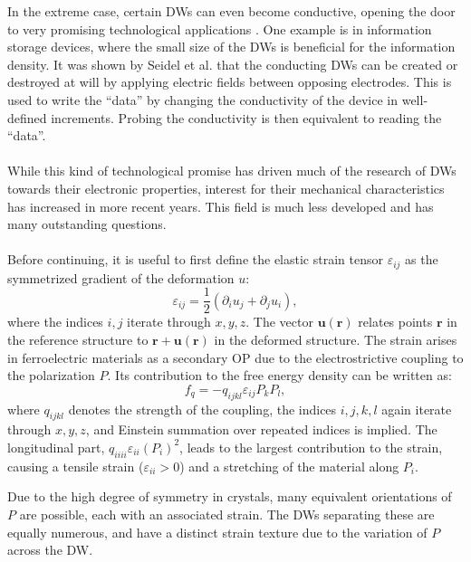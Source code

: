 In the extreme case, certain DWs can even become conductive, opening the door to very promising technological applications \cite{Seidel2009}.
One example is in information storage devices, where the small size of the DWs is beneficial for the information density.
It was shown by Seidel et al.\cite{Seidel2009} that the conducting DWs can be created or destroyed at will by applying electric fields between opposing electrodes. This is used to write the ``data'' by changing the conductivity of the device in well-defined increments.
Probing the conductivity is then equivalent to reading the ``data''. 
\\\\
While this kind of technological promise has driven much of the research of DWs towards their electronic properties, interest for their mechanical characteristics has increased in more recent years.
This field is much less developed and has many outstanding questions.
\\\\
Before continuing, it is useful to first define the elastic strain tensor $\varepsilon_{ij}$ as the symmetrized gradient of the deformation $u$:
\begin{equation}
\varepsilon_{ij} = \frac{1}{2}(\partial_i u_j + \partial_j u_i),
\end{equation}
where the indices $i,j$ iterate through $x, y, z$.
The vector $\bm{u}(\bm{r})$ relates points $\bm{r}$ in the reference structure to $\bm{r} + \bm{u}(\bm{r})$ in the deformed structure.
The strain arises in ferroelectric materials as a secondary OP due to the electrostrictive coupling to the polarization $P$.
Its contribution to the free energy density can be written as:
\begin{equation}
	\label{eq:BTO_electrostriction}
	f_{q}=-q_{ijkl}\varepsilon_{ij}P_{k}P_{l},
\end{equation}
where $q_{ijkl}$ denotes the strength of the coupling, the indices $i, j, k, l$ again iterate through $x, y, z$, and Einstein summation over repeated indices is implied.
The longitudinal part, $q_{iiii} \varepsilon_{ii} (P_i)^2$, leads to the largest contribution to the strain, causing a tensile strain ($\varepsilon_{ii}>0$) and a stretching of the material along $P_i$.

Due to the high degree of symmetry in crystals, many equivalent orientations of $P$ are possible, each with an associated strain. The DWs separating these are equally numerous, and have a distinct strain texture due to the variation of $P$ across the DW.

